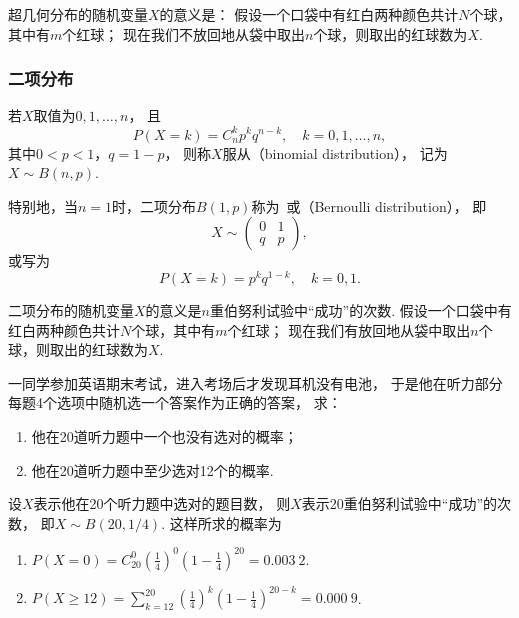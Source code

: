 超几何分布的随机变量\(X\)的意义是：
假设一个口袋中有红白两种颜色共计\(N\)个球，其中有\(m\)个红球；
现在我们不放回地从袋中取出\(n\)个球，则取出的红球数为\(X\).

\subsubsection{二项分布}
\begin{definition}
若\(X\)取值为\(0,1,\dotsc,n\)，
且\begin{equation}\label{equation:离散型分布.二项分布的分布律}
	P(X=k) = C_n^k p^k q^{n-k},
	\quad k=0,1,\dotsc,n,
\end{equation}
其中\(0 < p < 1\)，\(q = 1-p\)，
则称\(X\)服从（binomial distribution），
记为\(X \sim B(n,p)\).

特别地，当\(n = 1\)时，二项分布\(B(1,p)\)称为~或（Bernoulli distribution），
即\begin{equation*}
	X \sim \begin{pmatrix} 0 & 1 \\ q & p \end{pmatrix},
\end{equation*}
或写为\begin{equation*}
	P(X=k) = p^k q^{1-k}, \quad k=0,1.
\end{equation*}
\end{definition}

二项分布的随机变量\(X\)的意义是\(n\)重伯努利试验中“成功”的次数.
假设一个口袋中有红白两种颜色共计\(N\)个球，其中有\(m\)个红球；
现在我们有放回地从袋中取出\(n\)个球，则取出的红球数为\(X\).

\begin{example}
一同学参加英语期末考试，进入考场后才发现耳机没有电池，
于是他在听力部分每题4个选项中随机选一个答案作为正确的答案，
求：\begin{enumerate}
	\item 他在20道听力题中一个也没有选对的概率；
	\item 他在20道听力题中至少选对12个的概率.
\end{enumerate}
\begin{solution}
设\(X\)表示他在20个听力题中选对的题目数，
则\(X\)表示20重伯努利试验中“成功”的次数，
即\(X \sim B(20, 1/4)\).
这样所求的概率为\begin{enumerate}
	\item \(P(X=0) = C_{20}^0 \left(\frac14\right)^0 \left(1-\frac14\right)^{20} = 0.003\ 2\).
	\item \(P(X \geq 12) = \sum_{k=12}^{20} \left(\frac14\right)^k \left(1-\frac14\right)^{20-k} = 0.000\ 9\).
\end{enumerate}
\end{solution}
\end{example}

